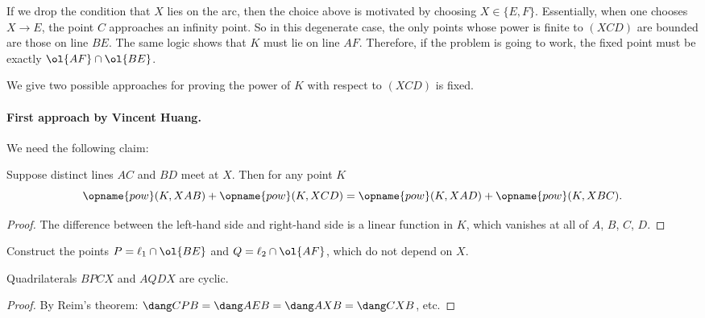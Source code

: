 \documentclass[11pt]{scrartcl}
\begin{document}
\begin{remark*}
  If we drop the condition that $X$ lies on the arc,
  then the choice above is motivated by choosing $X \in \{E,F\}$.
  Essentially, when one chooses $X \to E$,
  the point $C$ approaches an infinity point.
  So in this degenerate case, the only points whose
  power is finite to $(XCD)$ are bounded are those on line $BE$.
  The same logic shows that $K$ must lie on line $AF$.
  Therefore, if the problem is going to work,
  the fixed point must be exactly $\ol{AF} \cap \ol{BE}$.
\end{remark*}

We give two possible approaches for proving the power
of $K$ with respect to $(XCD)$ is fixed.

\paragraph{First approach by Vincent Huang.}
We need the following claim:
\begin{claim*}
  Suppose distinct lines $AC$ and $BD$ meet at $X$.
  Then for any point $K$
  \[ \opname{pow}(K, XAB) + \opname{pow}(K, XCD)
    = \opname{pow}(K, XAD) + \opname{pow}(K, XBC). \]
\end{claim*}
\begin{proof}
  The difference between the left-hand side and right-hand
  side is a linear function in $K$,
  which vanishes at all of $A$, $B$, $C$, $D$.
\end{proof}

Construct the points $P = \ell_1 \cap \ol{BE}$
and $Q = \ell_2 \cap \ol{AF}$, which do not depend on $X$.
\begin{claim*}
  Quadrilaterals $BPCX$ and $AQDX$ are cyclic.
\end{claim*}
\begin{proof}
  By Reim's theorem: $\dang CPB = \dang AEB = \dang AXB = \dang CXB$, etc.
\end{proof}
\end{document}
